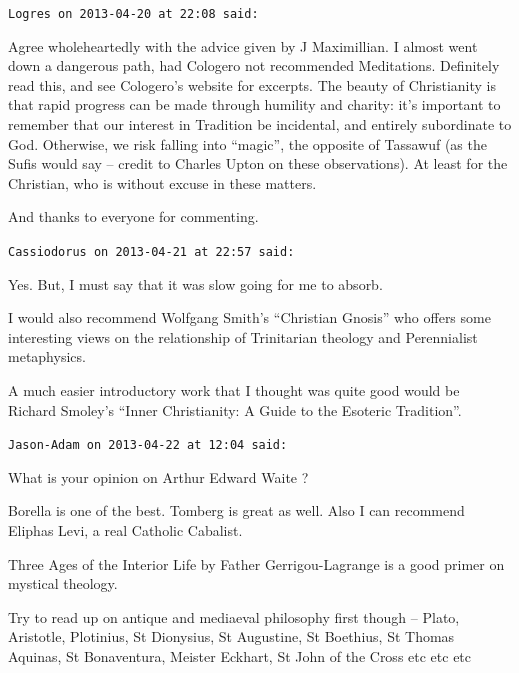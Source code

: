 \begin{footnotesize}
\begin{sffamily}
\hfill

\texttt{Logres on 2013-04-20 at 22:08 said:}

Agree wholeheartedly with the advice given by J Maximillian. I almost went down a dangerous path, had Cologero not recommended Meditations. Definitely read this, and see Cologero's website for excerpts. The beauty of Christianity is that rapid progress can be made through humility and charity: it's important to remember that our interest in Tradition be incidental, and entirely subordinate to God. Otherwise, we risk falling into ``magic'', the opposite of Tassawuf (as the Sufis would say -- credit to Charles Upton on these observations). At least for the Christian, who is without excuse in these matters.

And thanks to everyone for commenting.

\hfill

\texttt{Cassiodorus on 2013-04-21 at 22:57 said:}

Yes. But, I must say that it was slow going for me to absorb.

I would also recommend Wolfgang Smith's ``Christian Gnosis'' who offers some interesting views on the relationship of Trinitarian theology and Perennialist metaphysics.

A much easier introductory work that I thought was quite good would be Richard Smoley's ``Inner Christianity: A Guide to the Esoteric Tradition''.

\hfill

\texttt{Jason-Adam on 2013-04-22 at 12:04 said:}

What is your opinion on Arthur Edward Waite ?

Borella is one of the best. Tomberg is great as well. Also I can recommend Eliphas Levi, a real Catholic Cabalist.

Three Ages of the Interior Life by Father Gerrigou-Lagrange is a good primer on mystical theology.

Try to read up on antique and mediaeval philosophy first though -- Plato, Aristotle, Plotinius, St Dionysius, St Augustine, St Boethius, St Thomas Aquinas, St Bonaventura, Meister Eckhart, St John of the Cross etc etc etc

\end{sffamily}
\end{footnotesize}

